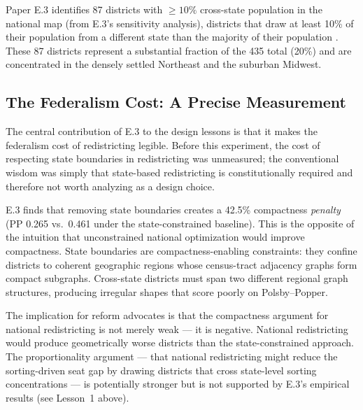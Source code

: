 Paper E.3 identifies 87 districts with $\geq 10\%$ cross-state population in the national map
(from E.3's sensitivity analysis), districts
that draw at least 10\% of their population from a different state than the
majority of their population \citep{dellaLibera2026e3}.  These 87 districts
represent a substantial fraction of the 435 total (20\%) and are concentrated
in the densely settled Northeast and the suburban Midwest.

\subsection{The Federalism Cost: A Precise Measurement}

The central contribution of E.3 to the design lessons is that it makes the
federalism cost of redistricting legible.  Before this experiment, the cost of
respecting state boundaries in redistricting was unmeasured; the conventional
wisdom was simply that state-based redistricting is constitutionally required
and therefore not worth analyzing as a design choice.

E.3 finds that removing state boundaries creates a 42.5\% compactness
\emph{penalty} (PP 0.265 vs.\ 0.461 under the state-constrained baseline).
This is the opposite of the intuition that unconstrained national optimization
would improve compactness.
State boundaries are compactness-enabling constraints: they confine districts
to coherent geographic regions whose census-tract adjacency graphs form compact
subgraphs.
Cross-state districts must span two different regional graph structures,
producing irregular shapes that score poorly on Polsby--Popper.

The implication for reform advocates is that the compactness argument for
national redistricting is not merely weak --- it is negative.  National
redistricting would produce geometrically worse districts than the
state-constrained approach.  The proportionality argument --- that national
redistricting might reduce the sorting-driven seat gap by drawing districts
that cross state-level sorting concentrations --- is potentially stronger but
is not supported by E.3's empirical results (see Lesson~1 above).

